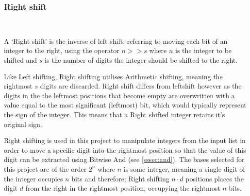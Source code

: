 \documentclass[12pt]{article}
\begin{document}
\subsubsection{Right shift}\
\label{sssec:rightshift}
\par
A `Right shift' is the inverse of left shift, referring to moving each bit of an integer to the right, using the operator $n >> s$ where $n$ is the integer to be shifted and $s$ is the number of digits the integer should be shifted to the right.
\par
Like Left shifting, Right shifting utilises Arithmetic shifting, meaning the rightmost $s$ digits are discarded. Right shift differs from leftshift however as the digits in the the leftmost positions that become empty are overwritten with a value equal to the most significant (leftmost) bit, which would typically represent the sign of the integer. This means that a Right shifted integer retains it's original sign.
\par
Right shifting is used in this project to manipulate integers from the input list in order to move a specific digit into the rightmost position so that the value of this digit can be extracted using Bitwise And (see \ref{sssec:and}). The bases selected for this project are of the order $2^n$ where $n$ is some integer, meaning a single digit of the integer occupies $n$ bits and therefore; Right shifting $n \cdot d$ positions places the digit $d$ from the right in the rightmost position, occupying the rightmost $n$ bits. 
\end{document}
